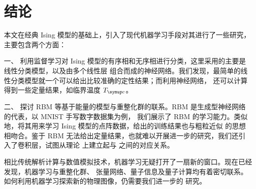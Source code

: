 \chapter{结论}

本文在经典 Ising 模型的基础上，引入了现代机器学习手段对其进行了一些研究，主要包含两个方面：

一、
利用监督学习对 Ising 模型的有序相和无序相进行分类，这里采用的主要是线性分类模型，以及由多个线性层
组合而成的神经网络。我们发现，最简单的线性分类模型就一个可以给出比较准确的定性结果；而利用神经网络，
还可以计算得到一些定量结果，如临界温度 $\Tc$。

二、
探讨 RBM 等基于能量的模型与重整化群的联系。RBM 是生成型神经网络的代表，以 MNIST 手写数字数据集为例，
我们展示了 RBM 的学习能力。类似地，将其用来学习 Ising 模型的点阵数据，给出的训练结果也与粗粒近似
的思想相吻合。鉴于 RBM 无法给出定量结果，也就难以开展进一步的研究，我们还引入了卷积层，试图从理论
上建立起与 \AdSCFT{} 之间的对应关系。

相比传统解析计算与数值模拟技术，机器学习无疑打开了一扇新的窗口。现在已经发现，机器学习与重整化群、
张量网络、量子信息及量子计算均有着密切联系。如何利用机器学习探索新的物理图像，仍需要我们进一步的
研究。
